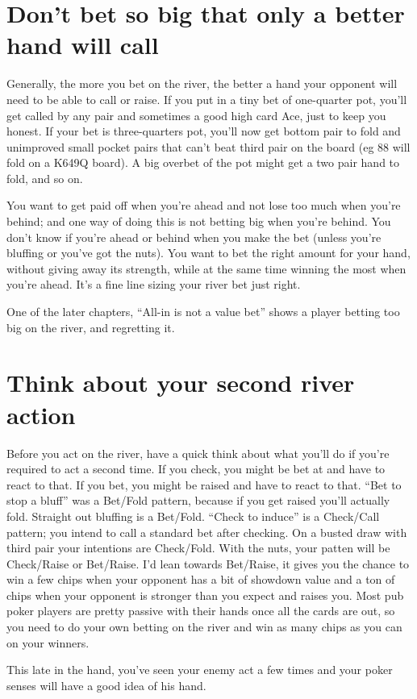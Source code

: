 \section{Don't bet so big that only a better hand will call}

Generally, the more you bet on the river, the better a hand your
opponent will need to be able to call or raise. If you put in
a tiny bet of one-quarter pot, you'll get called by any pair and
sometimes a good high card Ace, just to keep you honest. If your
bet is three-quarters pot, you'll now get bottom pair to fold
and unimproved small pocket pairs that can't beat third pair on the
board (eg 88 will fold on a K649Q board). A big overbet of the pot
might get a two pair hand to fold, and so on.

You want to get paid off when you're ahead and not lose too much
when you're behind; and one way of doing this is not betting big when
you're behind. You don't know if you're ahead or behind when you
make the bet (unless you're bluffing or you've got the nuts). You
want to bet the right amount for your hand, without giving away
its strength, while at the same time winning the most when you're ahead.
It's a fine line sizing your river bet just right.

One of the later chapters, ``All-in is not a value bet'' shows a
player betting too big on the river, and regretting it.

\section{Think about your second river action}

Before you act on the river, have a quick think about what you'll
do if you're required to act a second time. If you check, you might
be bet at and have to react to that. If you bet, you might be raised
and have to react to that. ``Bet to stop a bluff'' was a Bet/Fold
pattern, because if you get raised you'll actually fold. Straight out
bluffing is a Bet/Fold. ``Check to induce'' is a Check/Call pattern;
you intend to call a standard bet after checking. On a busted draw
with third pair your intentions are Check/Fold. With the nuts, your
patten will be Check/Raise or Bet/Raise. I'd lean towards Bet/Raise,
it gives you the chance to win a few chips when your opponent has a
bit of showdown value and a ton of chips when your opponent is
stronger than you expect and raises you. Most pub poker players are
pretty passive with their hands once all the cards are out, so you
need to do your own betting on the river and win as many chips as you
can on your winners.

This late in the hand, you've seen your enemy act a few times and your
poker senses will have a good idea of his hand.
